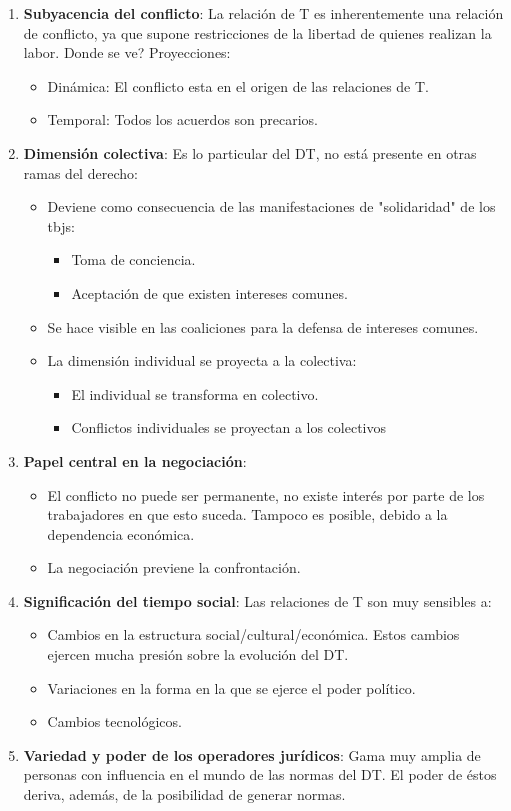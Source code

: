 \documentclass[spanish,12pt,a4paper,titlepage]{report}
\begin{document}
\begin{enumerate}
\item \textbf{Subyacencia del conflicto}: La relación de T es inherentemente una relación de conflicto, ya que supone restricciones de la libertad de quienes realizan la labor. Donde se ve? Proyecciones:
  \begin{itemize}
  \item Dinámica: El conflicto esta en el origen de las relaciones de T.
  \item Temporal: Todos los acuerdos son precarios.
  \end{itemize}
\item \textbf{Dimensión colectiva}: Es lo particular del DT, no está presente en otras ramas del derecho:
  \begin{itemize}
  \item Deviene como consecuencia de las manifestaciones de "solidaridad" de los tbjs:
    \begin{itemize}
    \item Toma de conciencia.
    \item Aceptación de que existen intereses comunes.
    \end{itemize}
  \item Se hace visible en las coaliciones para la defensa de intereses comunes.
  \item La dimensión individual se proyecta a la colectiva:
    \begin{itemize}
    \item El individual se transforma en colectivo.
    \item Conflictos individuales se proyectan a los colectivos
    \end{itemize}
  \end{itemize}
\item \textbf{Papel central en la negociación}:
  \begin{itemize}
  \item El conflicto no puede ser permanente, no existe interés por parte de los trabajadores en que esto suceda. Tampoco es posible, debido a la dependencia económica.
  \item La negociación previene la confrontación.
  \end{itemize}
\item \textbf{Significación del tiempo social}: Las relaciones de T son muy sensibles a:
  \begin{itemize}
  \item Cambios en la estructura social/cultural/económica. Estos cambios ejercen mucha presión sobre la evolución del DT.
  \item Variaciones en la forma en la que se ejerce el poder político.
  \item Cambios tecnológicos.
  \end{itemize}
\item \textbf{Variedad y poder de los operadores jurídicos}: Gama muy amplia de personas con influencia en el mundo de las normas del DT. El poder de éstos deriva, además, de la posibilidad de generar normas.
\end{enumerate}
\end{document}

